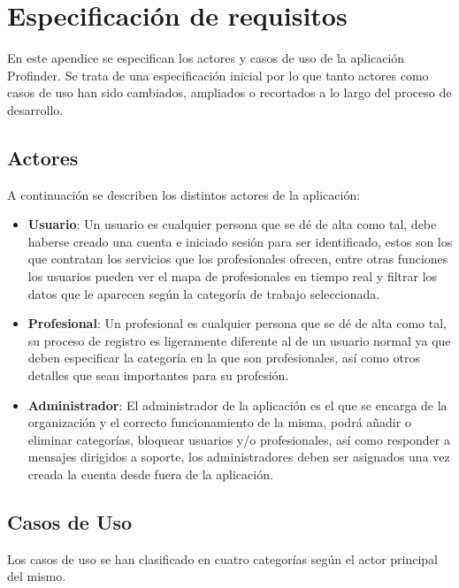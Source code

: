 \chapter{Especificación de requisitos}
\label{Appendix:srs}

En este apendice se especifican los actores y casos de uso de la aplicación Profinder. Se trata de una especificación inicial por lo que tanto actores como casos de uso han sido cambiados, ampliados o recortados a lo largo del proceso de desarrollo.

\section{Actores}
A continuación se describen los distintos actores de la aplicación:
\begin{itemize}
    \item \textbf{Usuario}: Un usuario es cualquier persona que se dé de alta como tal, debe haberse creado una cuenta e iniciado sesión para ser identificado, estos son los que contratan los servicios que los profesionales ofrecen, entre otras funciones los usuarios pueden ver el mapa de profesionales en tiempo real y filtrar los datos que le aparecen según la categoría de trabajo seleccionada.
    \item \textbf{Profesional}: Un profesional es cualquier persona que se dé de alta como tal, su proceso de registro es ligeramente diferente al de un usuario normal ya que deben especificar la categoría en la que son profesionales, así como otros detalles que sean importantes para su profesión.
    \item \textbf{Administrador}: El administrador de la aplicación es el que se encarga de la organización y el correcto funcionamiento de la misma, podrá añadir o eliminar categorías, bloquear usuarios y/o profesionales, así como responder a mensajes dirigidos a soporte, los administradores deben ser asignados una vez creada la cuenta desde fuera de la aplicación.
\end{itemize}
\section{Casos de Uso}
Los casos de uso se han clasificado en cuatro categorías según el actor principal del mismo.
